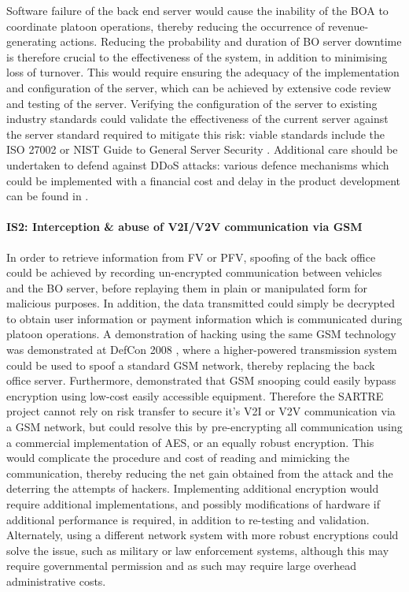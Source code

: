 \documentclass[british,11pt,a4paper]{article}
\begin{document}
Software failure of the back end server would cause the inability of the BOA to coordinate platoon operations, thereby reducing the occurrence of revenue-generating actions. Reducing the probability and duration of BO server downtime is therefore crucial to the effectiveness of the system, in addition to minimising loss of turnover. This would require ensuring the adequacy of the implementation and configuration of the server, which can be achieved by extensive code review and testing of the server. Verifying the configuration of the server to existing industry standards could validate the effectiveness of the current server against the server standard required to mitigate this risk: viable standards include the ISO 27002 \citet{Iso2005-nn} or NIST Guide to General Server Security \citet{noauthor_undated-kw}. Additional care should be undertaken to defend against DDoS attacks: various defence mechanisms which could be implemented with a financial cost and delay in the product development can be found in \citet{Zargar2013-xx}.

\paragraph{IS2: Interception \& abuse of V2I/V2V communication via GSM \newline}
\label{par:IS2}

In order to retrieve information from FV or PFV, spoofing of the back office could be achieved by recording un-encrypted communication between vehicles and the BO server, before replaying them in plain or manipulated form for malicious purposes. In addition, the data transmitted could simply be decrypted to obtain user information or payment information which is communicated during platoon operations. A demonstration of hacking using the same GSM technology was demonstrated at DefCon 2008 \cite{Paget2010-ne}, where a higher-powered transmission system could be used to spoof a standard GSM network, thereby replacing the back office server. Furthermore, \citet{Hulton2008-jr}demonstrated that GSM snooping could easily bypass encryption using low-cost easily accessible equipment. Therefore the SARTRE project cannot rely on risk transfer to secure it’s V2I or V2V communication via a GSM network, but could resolve this by pre-encrypting all communication using a commercial implementation of AES, or an equally robust encryption. This would complicate the procedure and cost of reading and mimicking the communication, thereby reducing the net gain obtained from the attack and the deterring the attempts of hackers. Implementing additional encryption would require additional implementations, and possibly modifications of hardware if additional performance is required, in addition to re-testing and validation. Alternately, using a different network system with more robust encryptions could solve the issue, such as military or law enforcement systems, although this may require governmental permission and as such may require large overhead administrative costs. 
\end{document}
